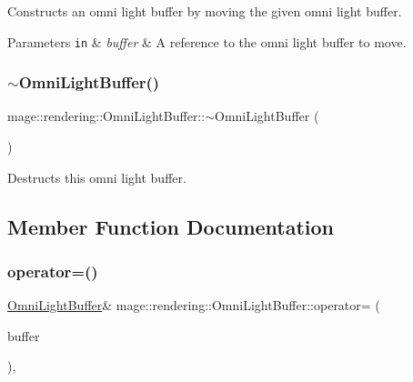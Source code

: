 Constructs an omni light buffer by moving the given omni light buffer.


\begin{DoxyParams}[1]{Parameters}
\mbox{\tt in}  & {\em buffer} & A reference to the omni light buffer to move. \\
\hline
\end{DoxyParams}
\mbox{\label{structmage_1_1rendering_1_1_omni_light_buffer_a67eee7a5d21a124ffe74cd5ae94196b6}} 
\subsubsection{\texorpdfstring{$\sim$\+Omni\+Light\+Buffer()}{~OmniLightBuffer()}}
{\footnotesize\ttfamily mage\+::rendering\+::\+Omni\+Light\+Buffer\+::$\sim$\+Omni\+Light\+Buffer (\begin{DoxyParamCaption}{ }\end{DoxyParamCaption})\hspace{0.3cm}{\ttfamily [default]}}

Destructs this omni light buffer. 

\subsection{Member Function Documentation}
\mbox{\label{structmage_1_1rendering_1_1_omni_light_buffer_a915b047abdc1068279b8308b189b60f5}} 
\subsubsection{\texorpdfstring{operator=()}{operator=()}\hspace{0.1cm}{\footnotesize\ttfamily [1/2]}}
{\footnotesize\ttfamily \mbox{\hyperlink{structmage_1_1rendering_1_1_omni_light_buffer}{Omni\+Light\+Buffer}}\& mage\+::rendering\+::\+Omni\+Light\+Buffer\+::operator= (\begin{DoxyParamCaption}\item[{const \mbox{\hyperlink{structmage_1_1rendering_1_1_omni_light_buffer}{Omni\+Light\+Buffer}} \&}]{buffer }\end{DoxyParamCaption})\hspace{0.3cm}{\ttfamily [default]}, {\ttfamily [noexcept]}}

